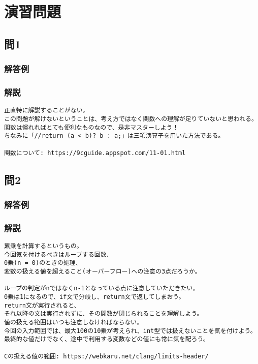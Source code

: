 \section{演習問題}
\subsection{問1}
\subsubsection{解答例}

\subsubsection{解説}
\begin{verbatim}
正直特に解説することがない。
この問題が解けないということは、考え方ではなく関数への理解が足りていないと思われる。
関数は慣れればとても便利なものなので、是非マスターしよう！
ちなみに「//return (a < b)? b : a;」は三項演算子を用いた方法である。

関数について: https://9cguide.appspot.com/11-01.html
\end{verbatim}

\subsection{問2}
\subsubsection{解答例}

\subsubsection{解説}
\begin{verbatim}
累乗を計算するというもの。
今回気を付けるべきはループする回数、
0乗(n = 0)のときの処理、
変数の扱える値を超えること(オーバーフロー)への注意の3点だろうか。

ループの判定がnではなくn-1となっている点に注意していただきたい。
0乗は1になるので、if文で分岐し、return文で返してしまおう。
return文が実行されると、
それ以降の文は実行されずに、その関数が閉じられることを理解しよう。
値の扱える範囲はいつも注意しなければならない。
今回の入力範囲では、最大100の10乗が考えられ、int型では扱えないことを気を付けよう。
最終的な値だけでなく、途中で利用する変数などの値にも常に気を配ろう。

Cの扱える値の範囲: https://webkaru.net/clang/limits-header/
\end{verbatim}

